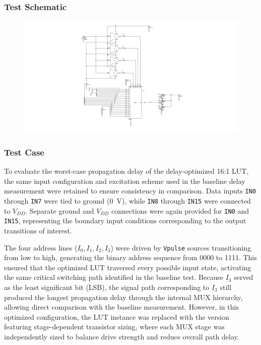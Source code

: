 \documentclass[12pt]{article}
\begin{document}
\subsubsection{Test Schematic}
\begin{figure}[H]
    \centering
    \includegraphics[width=\linewidth]{writeup//figures/updated_delay_opt_testschem.png}
    \caption{}
\end{figure}

\newpage
\subsubsection*{Test Case}

To evaluate the worst-case propagation delay of the delay-optimized 16:1 LUT, the same input configuration and excitation scheme used in the baseline delay measurement were retained to ensure consistency in comparison. Data inputs \texttt{IN0} through \texttt{IN7} were tied to ground (0~V), while \texttt{IN8} through \texttt{IN15} were connected to $V_{DD}$. Separate ground and $V_{DD}$ connections were again provided for \texttt{IN0} and \texttt{IN15}, representing the boundary input conditions corresponding to the output transitions of interest.

The four address lines ($I_0, I_1, I_2, I_3$) were driven by \texttt{Vpulse} sources transitioning from low to high, generating the binary address sequence from 0000 to 1111. This ensured that the optimized LUT traversed every possible input state, activating the same critical switching path identified in the baseline test. Because $I_3$ served as the least significant bit (LSB), the signal path corresponding to $I_3$ still produced the longest propagation delay through the internal MUX hierarchy, allowing direct comparison with the baseline measurement. However, in this optimized configuration, the LUT instance was replaced with the version featuring stage-dependent transistor sizing, where each MUX stage was independently sized to balance drive strength and reduce overall path delay.
\end{document}
